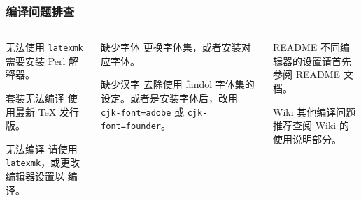 \begin{frame}[label=compile]
  \frametitle{编译问题排查}
  \begin{columns}
    \begin{column}{0.33\textwidth}
      \begin{alertblock}{无法使用 \texttt{latexmk}}
         需要安装 Perl 解释器。
      \end{alertblock}  
      \begin{alertblock}{\CTeX{} 套装无法编译}
        使用最新 \TeX{} 发行版。
      \end{alertblock}
      \begin{alertblock}{ 无法编译}
        请使用 \texttt{latexmk}，或更改编辑器设置以  编译。
      \end{alertblock}
    \end{column}
    \begin{column}{0.33\textwidth}
      \begin{alertblock}{缺少字体 }
        更换字体集，或者安装对应字体。
      \end{alertblock}
      \begin{alertblock}{缺少汉字 }
        去除使用 fandol 字体集的设定。或者是安装字体后，改用 \texttt{cjk-font=adobe} 或 \texttt{cjk-font=founder}。
      \end{alertblock}
    \end{column}
    \begin{column}{0.33\textwidth}
      \begin{block}{\faInfoCircle{} README}
        不同编辑器的设置请首先参阅 README  文档。
      \end{block}
      \begin{block}{\faBookOpen{} Wiki}
        其他编译问题推荐查阅 Wiki  的使用说明部分。
      \end{block}
    \end{column}
  \end{columns}
\end{frame}

